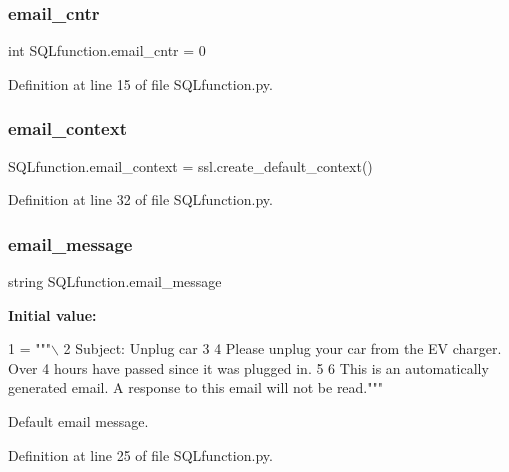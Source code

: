 \subsubsection{email\+\_\+cntr}
{\footnotesize\ttfamily int S\+Q\+Lfunction.\+email\+\_\+cntr = 0}



Definition at line 15 of file S\+Q\+Lfunction.\+py.

\mbox{\label{namespace_s_q_lfunction_a7ec226cfeab195de604b38e8c7b2d0eb}} 
\subsubsection{email\+\_\+context}
{\footnotesize\ttfamily S\+Q\+Lfunction.\+email\+\_\+context = ssl.\+create\+\_\+default\+\_\+context()}



Definition at line 32 of file S\+Q\+Lfunction.\+py.

\mbox{\label{namespace_s_q_lfunction_ae767f70baa76040d2b29bd6eeefd7bbe}} 
\subsubsection{email\+\_\+message}
{\footnotesize\ttfamily string S\+Q\+Lfunction.\+email\+\_\+message}

{\bfseries Initial value\+:}
\begin{DoxyCode}
1 =  \textcolor{stringliteral}{"""\(\backslash\)}
2 \textcolor{stringliteral}{Subject: Unplug car}
3 \textcolor{stringliteral}{}
4 \textcolor{stringliteral}{Please unplug your car from the EV charger. Over 4 hours have passed since it was plugged in.}
5 \textcolor{stringliteral}{}
6 \textcolor{stringliteral}{This is an automatically generated email. A response to this email will not be read."""}
\end{DoxyCode}


Default email message. 



Definition at line 25 of file S\+Q\+Lfunction.\+py.

\mbox{\label{namespace_s_q_lfunction_a5964aea00837148a0d731102edf6ac5c}} 
